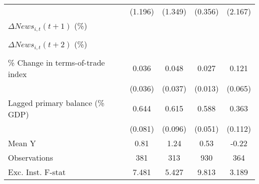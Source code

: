 {\begin{tabular}{l*{4}{c}}
                    &     (1.196)         &     (1.349)         &     (0.356)         &     (2.167)         \\
\addlinespace
$ \Delta News_{i,t}(t+1)$ (\%)&                     &                     &                     &                     \\
                    &                     &                     &                     &                     \\
\addlinespace
$ \Delta News_{i,t}(t+2)$ (\%)&                     &                     &                     &                     \\
                    &                     &                     &                     &                     \\
\addlinespace
\% Change in terms-of-trade index&       0.036         &       0.048         &       0.027\sym{**} &       0.121\sym{*}  \\
                    &     (0.036)         &     (0.037)         &     (0.013)         &     (0.065)         \\
\addlinespace
Lagged primary balance (\% GDP)&       0.644\sym{***}&       0.615\sym{***}&       0.588\sym{***}&       0.363\sym{***}\\
                    &     (0.081)         &     (0.096)         &     (0.051)         &     (0.112)         \\
\midrule
Mean Y              &        0.81         &        1.24         &        0.53         &       -0.22         \\
Observations        &         381         &         313         &         930         &         364         \\
Exc. Inst. F-stat   &       7.481         &       5.427         &       9.813         &       3.189         \\
\bottomrule
\end{tabular}
}

